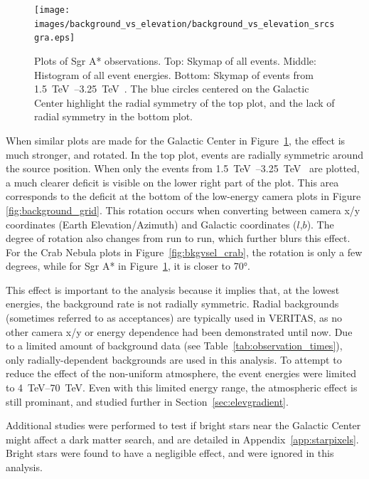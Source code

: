     \begin{figure}[p]
      \centering
      \texttt{[image: images/background\_vs\_elevation/background\_vs\_elevation\_srcsgra.eps]}
      \caption[Background Vs Elevation Sgr A*]
      {\small 
        Plots of Sgr A* observations.
        Top: Skymap of all events.
        Middle: Histogram of all event energies.
        Bottom: Skymap of events from \SIrange{1.5}{3.25}{\TeV{}}.  
        The blue circles centered on the Galactic Center highlight the radial symmetry of the top plot, and the lack of radial symmetry in the bottom plot.
      }
      \label{fig:bkgvsel_sgra}
    \end{figure}
    
    When similar plots are made for the Galactic Center in Figure~\ref{fig:bkgvsel_sgra}, the effect is much stronger, and rotated.
    In the top plot, events are radially symmetric around the source position.
    When only the events from \SIrange{1.5}{3.25}{\TeV{}} are plotted, a much clearer deficit is visible on the lower right part of the plot.
    This area corresponds to the deficit at the bottom of the low-energy camera plots in Figure \ref{fig:background_grid}.
    This rotation occurs when converting between camera x/y coordinates (Earth Elevation/Azimuth) and Galactic coordinates ($l$,$b$).
    The degree of rotation also changes from run to run, which further blurs this effect.
    For the Crab Nebula plots in Figure~\ref{fig:bkgvsel_crab}, the rotation is only a few degrees, while for Sgr A* in Figure~\ref{fig:bkgvsel_sgra}, it is closer to \ang{70}.
    
    This effect is important to the analysis because it implies that, at the lowest energies, the background rate is not radially symmetric.
    Radial backgrounds (sometimes referred to as acceptances) are typically used in VERITAS, as no other camera x/y or energy dependence had been demonstrated until now.
    Due to a limited amount of background data (see Table~\ref{tab:observation_times}), only radially-dependent backgrounds are used in this analysis.
    To attempt to reduce the effect of the non-uniform atmosphere, the event energies were limited to \SIrange{4}{70}{TeV}.
    Even with this limited energy range, the atmospheric effect is still prominant, and studied further in Section~\ref{sec:elevgradient}.
    
    Additional studies were performed to test if bright stars near the Galactic Center might affect a dark matter search, and are detailed in Appendix~\ref{app:starpixels}.
    Bright stars were found to have a negligible effect, and were ignored in this analysis.
    
    \FloatBarrier

